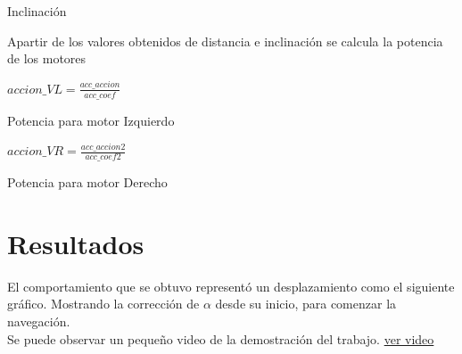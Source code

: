 \documentclass[oneside,onecolumn]{article}
\begin{document}
\begin{algorithm}[H]
\caption{Inclinación}
\end{algorithm}

\newpage
Apartir de los valores obtenidos de distancia e inclinación se calcula la potencia de los motores


\begin{algorithm}
  $accion\_VL = \frac{acc\_accion}{acc\_coef}$
  \caption{Potencia para motor Izquierdo}
\end{algorithm}

\begin{algorithm}
  $accion\_VR = \frac{acc\_accion2}{acc\_coef2}$
  \caption{Potencia para motor Derecho}
\end{algorithm}


\newpage
\section{Resultados}

El comportamiento que se obtuvo representó un desplazamiento como el siguiente gráfico. Mostrando la corrección de $\alpha$ desde su inicio, para comenzar la navegación.\\

Se puede observar un pequeño video de la demostración del trabajo. \href{https://youtube.com/shorts/GgrXnc17P5M?feature=share}{ver video}
\end{document}
